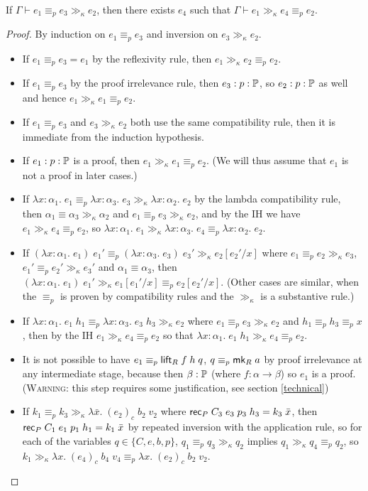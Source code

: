 \begin{lemma}\label{gg_compat}
If $\Gamma\vdash e_1\equiv_p e_3\gg_\kappa e_2$, then there exists $e_4$ such that $\Gamma\vdash e_1\gg_\kappa e_4\equiv_p e_2$.
\end{lemma}
\begin{proof}
By induction on $e_1\equiv_p e_3$ and inversion on $e_3\gg_\kappa e_2$.
\begin{itemize}
\item If $e_1\equiv_p e_3=e_1$ by the reflexivity rule, then $e_1\gg_\kappa e_2\equiv_p e_2$.
\item If $e_1\equiv_p e_3$ by the proof irrelevance rule, then $e_3:p:\P$, so $e_2:p:\P$ as well and hence $e_1\gg_\kappa e_1\equiv_p e_2$.
\item If $e_1\equiv_p e_3$ and $e_3\gg_\kappa e_2$ both use the same compatibility rule, then it is immediate from the induction hypothesis.
\item If $e_1:p:\P$ is a proof, then $e_1\gg_\kappa e_1\equiv_p e_2$. (We will thus assume that $e_1$ is not a proof in later cases.)
\item If $\lambda x:\alpha_1.\;e_1\equiv_p\lambda x:\alpha_3.\;e_3\gg_\kappa\lambda x:\alpha_2.\;e_2$ by the lambda compatibility rule, then $\alpha_1\equiv\alpha_3\gg_\kappa\alpha_2$ and $e_1\equiv_p e_3\gg_\kappa e_2$, and by the IH we have $e_1\gg_\kappa e_4\equiv_p e_2$, so $\lambda x:\alpha_1.\;e_1\gg_\kappa\lambda x:\alpha_3.\;e_4\equiv_p\lambda x:\alpha_2.\;e_2$.
\item If $(\lambda x:\alpha_1.\;e_1)\;e_1'\equiv_p(\lambda x:\alpha_3.\;e_3)\;e_3'\gg_\kappa e_2[e_2'/x]$ where $e_1\equiv_p e_2\gg_\kappa e_3$, $e_1'\equiv_p e_2'\gg_\kappa e_3'$ and $\alpha_1\equiv\alpha_3$, then $(\lambda x:\alpha_1.\;e_1)\;e_1'\gg_\kappa e_1[e_1'/x]\equiv_p e_2[e_2'/x]$. (Other cases are similar, when the $\equiv_p$ is proven by compatibility rules and the $\gg_\kappa$ is a substantive rule.)
\item If $\lambda x:\alpha_1.\;e_1\;h_1\equiv_p\lambda x:\alpha_3.\;e_3\;h_3\gg_\kappa e_2$ where $e_1\equiv_p e_3\gg_\kappa e_2$ and $h_1\equiv_p h_3\equiv_p x$, then by the IH $e_1\gg_\kappa e_4\equiv_p e_2$ so that $\lambda x:\alpha_1.\;e_1\;h_1\gg_\kappa e_4\equiv_p e_2$.
\item It is not possible to have $e_1\equiv_p\lift_R\;f\;h\;q$, $q\equiv_p \mk_R\;a$ by proof irrelevance at any intermediate stage, because then $\beta:\P$ (where $f:\alpha\to\beta$) so $e_1$ is a proof. (\textsc{Warning}: this step requires some justification, see section \ref{technical})
\item If $k_1\equiv_p k_3\gg_\kappa \lambda \bar x.\; (e_2)_c\;b_2\;v_2$ where $\rec_P\;C_3\;e_3\;p_3\;h_3=k_3\;\bar x$, then $\rec_P\;C_1\;e_1\;p_1\;h_1=k_1\;\bar x$ by repeated inversion with the application rule, so for each of the variables $q\in\{C,e,b,p\}$, $q_1\equiv_p q_3\gg_\kappa q_2$ implies $q_1\gg_\kappa q_4\equiv_p q_2$, so $k_1\gg_\kappa \lambda x.\; (e_4)_c\;b_4\;v_4\equiv_p\lambda x.\; (e_2)_c\;b_2\;v_2$.
\end{itemize}
\end{proof}
